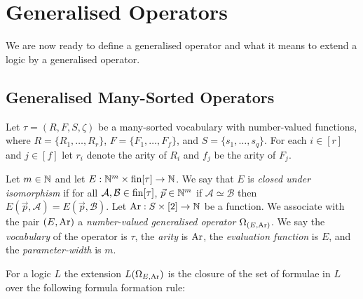 \documentclass[../main/thesis.tex]{subfiles}
\begin{document}

\section{Generalised Operators}
We are now ready to define a generalised operator and what it means to extend a
logic by a generalised operator. 

\subsection{Generalised Many-Sorted Operators}
Let $\tau = (R, F, S, \zeta)$ be a many-sorted vocabulary with number-valued
functions, where $R = \{R_1, \ldots, R_{r}\}$, $F = \{ F_1, \ldots, F_{f} \}$,
and $S = \{s_1, \ldots, s_{q}\}$. For each $i \in [r]$ and $j \in [f]$ let $r_i$
denote the arity of $R_i$ and $f_j$ be the arity of $F_j$.

Let $m \in \mathbb{N}$ and let $E : \mathbb{N}^{m} \times \text{\upshape fin}[\tau] \rightarrow \mathbb{N}$. We say
that $E$ is \emph{closed under isomorphism} if for all $\mathcal{A}, \mathcal{B}
\in \text{\upshape fin}[\tau]$, $\vec{p} \in \mathbb{N}^{m}$ if $\mathcal{A} \simeq \mathcal{B}$
then $E(\vec{p}, \mathcal{A}) = E(\vec{p}, \mathcal{B})$. Let $\text{\upshape Ar} : S \times
[2] \rightarrow \mathbb{N}$ be a function. We associate with the pair $(E, \text{\upshape Ar})$ a
\emph{number-valued generalised operator} $\Omega_{(E, \text{\upshape Ar})}$. We say the
\emph{vocabulary} of the operator is $\tau$, the \emph{arity} is $\text{\upshape Ar}$, the
\emph{evaluation function} is $E$, and the \emph{parameter-width} is $m$.

For a logic $L$ the extension $L(\Omega_{E, \text{\upshape Ar}})$ is the closure of the set of
formulae in $L$ over the following formula formation rule:
\end{document}
